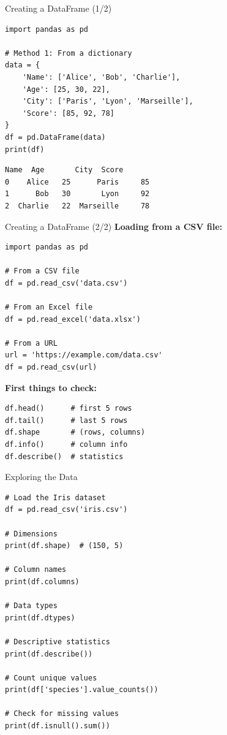 \documentclass[aspectratio=169]{beamer}
\begin{document}
\begin{frame}[fragile]{Creating a DataFrame (1/2)}
\begin{lstlisting}
import pandas as pd

# Method 1: From a dictionary
data = {
    'Name': ['Alice', 'Bob', 'Charlie'],
    'Age': [25, 30, 22],
    'City': ['Paris', 'Lyon', 'Marseille'],
    'Score': [85, 92, 78]
}
df = pd.DataFrame(data)
print(df)
\end{lstlisting}

\vspace{0.2cm}
\begin{lstlisting}[numbers=none,frame=none]
       Name  Age       City  Score
0    Alice   25      Paris     85
1      Bob   30       Lyon     92
2  Charlie   22  Marseille     78
\end{lstlisting}
\end{frame}

\begin{frame}[fragile]{Creating a DataFrame (2/2)}
\textbf{Loading from a CSV file:}
\begin{lstlisting}
import pandas as pd

# From a CSV file
df = pd.read_csv('data.csv')

# From an Excel file
df = pd.read_excel('data.xlsx')

# From a URL
url = 'https://example.com/data.csv'
df = pd.read_csv(url)
\end{lstlisting}

\vspace{0.3cm}
\textbf{First things to check:}
\begin{lstlisting}
df.head()      # first 5 rows
df.tail()      # last 5 rows
df.shape       # (rows, columns)
df.info()      # column info
df.describe()  # statistics
\end{lstlisting}
\end{frame}

\begin{frame}[fragile]{Exploring the Data}
\begin{lstlisting}
# Load the Iris dataset
df = pd.read_csv('iris.csv')

# Dimensions
print(df.shape)  # (150, 5)

# Column names
print(df.columns)

# Data types
print(df.dtypes)

# Descriptive statistics
print(df.describe())

# Count unique values
print(df['species'].value_counts())

# Check for missing values
print(df.isnull().sum())
\end{lstlisting}
\end{frame}
\end{document}
